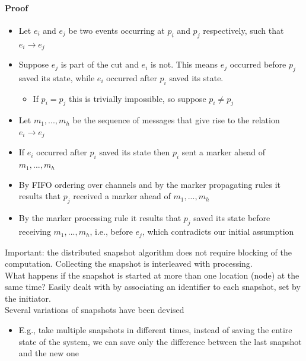 \documentclass[10pt,a4paper]{article}
\begin{document}
\paragraph{Proof}
\begin{itemize}
	\item Let $e_i$ and $e_j$ be two events occurring at $p_i$ and $p_j$ respectively, such that $e_i \rightarrow e_j$
	\item Suppose $e_j$ is part of the cut and $e_i$ is not. This means $e_j$ occurred before $p_j$ saved its state, while $e_i$ occurred after $p_i$ saved its state.
	\begin{itemize}
		\item If $p_i=p_j$ this is trivially impossible, so suppose $p_i \neq p_j$
	\end{itemize}
	\item Let $m_1, ..., m_h$ be the sequence of messages that give rise to the relation $e_i \rightarrow e_j$
	\item If $e_i$ occurred after $p_i$ saved its state then $p_i$ sent a marker ahead of $m_1, ..., m_h$
	\item By FIFO ordering over channels and by the marker propagating rules it results that $p_j$ received a marker ahead of $m_1, ..., m_h$
	\item By the marker processing rule it results that $p_j$ saved its state before receiving $m_1, ..., m_h$, i.e., before $e_j$, which contradicts our initial assumption
\end{itemize}
Important: the distributed snapshot algorithm does not require blocking of the computation. Collecting the snapshot is interleaved with processing.\\ What happens if the snapshot is started at more than one location (node) at the same time? Easily dealt with by associating an identifier to each snapshot, set by the initiator. \\
Several variations of snapshots have been devised
\begin{itemize}
	\item E.g., take multiple snapshots in different times, instead of saving the entire state of the system, we can save only the difference between the last snapshot and the new one
\end{itemize}
\end{document}
